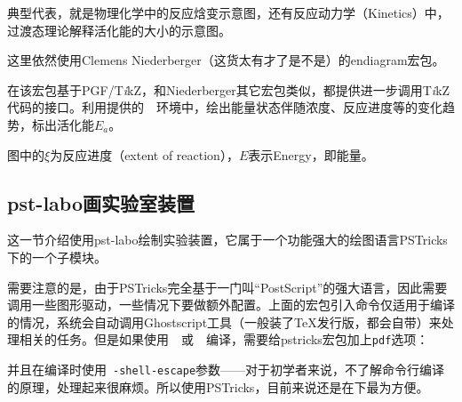 \documentclass[a4paper,UTF8,zihao = -4]{ctexart} %
\providecommand{\tikzlg}{PGF/T\textit{i}kZ}
\newcommand{\tkznm}{T\textit{i}kZ}
\begin{document}
典型代表，就是物理化学中的反应焓变示意图，还有反应动力学（Kinetics）中，过渡态理论解释活化能的大小的示意图。

这里依然使用Clemens Niederberger（这货太有才了是不是）的\textsf{endiagram}宏包。

\begin{dispListing}
\usepackage{endiagram} %
\end{dispListing}

在该宏包基于\tikzlg{}，和Niederberger其它宏包类似，都提供进一步调用\tkznm{}代码的接口。利用提供的~~环境中，绘出能量状态伴随浓度、反应进度等的变化趋势，标出活化能$E_a$。

\begin{dispExample}
\begin{endiagram}
  \ShowEa[label,label-pos=.3]
\end{endiagram}
\end{dispExample}

图中的$\xi$为反应进度（extent of reaction），$E$表示Energy，即能量。

\subsection{\textsf{pst-labo}画实验室装置}
\label{sec:pst-labo}

这一节介绍使用\textsf{pst-labo}绘制实验装置，它属于一个功能强大的绘图语言PSTricks下的一个子模块。

\begin{dispListing}
\usepackage{pstricks} %
\usepackage{pst-labo} %
\end{dispListing}

需要注意的是，由于PSTricks完全基于一门叫“PostScript”的强大语言，因此需要调用一些图形驱动，一些情况下要做额外配置。上面的宏包引入命令仅适用于编译的情况，系统会自动调用Ghostscript工具（一般装了\TeX{}发行版，都会自带）来处理相关的任务。但是如果使用~~或~~编译，需要给\textsf{pstricks}宏包加上\texttt{pdf}选项：

\begin{dispListing}
\usepackage[pdf]{pstricks}
\usepackage{pst-labo}  
\end{dispListing}

\noindent 并且在编译时使用~\texttt{-shell-escape}参数——对于初学者来说，不了解命令行编译的原理，处理起来很麻烦。所以使用\textsf{PSTricks}，目前来说还是在下最为方便。
\end{document}
